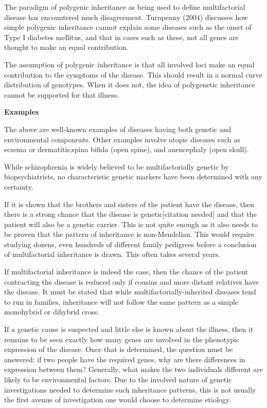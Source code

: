 The paradigm of polygenic inheritance as being used to define multifactorial disease has encountered much disagreement. Turnpenny (2004) discusses how simple polygenic inheritance cannot explain some diseases such as the onset of Type I diabetes mellitus, and that in cases such as these, not all genes are thought to make an equal contribution.

The assumption of polygenic inheritance is that all involved loci make an equal contribution to the symptoms of the disease. This should result in a normal curve distribution of genotypes. When it does not, the idea of polygenetic inheritance cannot be supported for that illness.

\textbf{Examples}

The above are well-known examples of diseases having both genetic and environmental components. Other examples involve atopic diseases such as eczema or dermatitis;spina bifida (open spine), and anencephaly (open skull).

While schizophrenia is widely believed to be multifactorially genetic by biopsychiatrists, no characteristic genetic markers have been determined with any certainty.

If it is shown that the brothers and sisters of the patient have the disease, then there is a strong chance that the disease is genetic{[}citation needed{]} and that the patient will also be a genetic carrier. This is not quite enough as it also needs to be proven that the pattern of inheritance is non-Mendelian. This would require studying dozens, even hundreds of different family pedigrees before a conclusion of multifactorial inheritance is drawn. This often takes several years.

If multifactorial inheritance is indeed the case, then the chance of the patient contracting the disease is reduced only if cousins and more distant relatives have the disease. It must be stated that while multifactorially-inherited diseases tend to run in families, inheritance will not follow the same pattern as a simple monohybrid or dihybrid cross.

If a genetic cause is suspected and little else is known about the illness, then it remains to be seen exactly how many genes are involved in the phenotypic expression of the disease. Once that is determined, the question must be answered: if two people have the required genes, why are there differences in expression between them? Generally, what makes the two individuals different are likely to be environmental factors. Due to the involved nature of genetic investigations needed to determine such inheritance patterns, this is not usually the first avenue of investigation one would choose to determine etiology.

